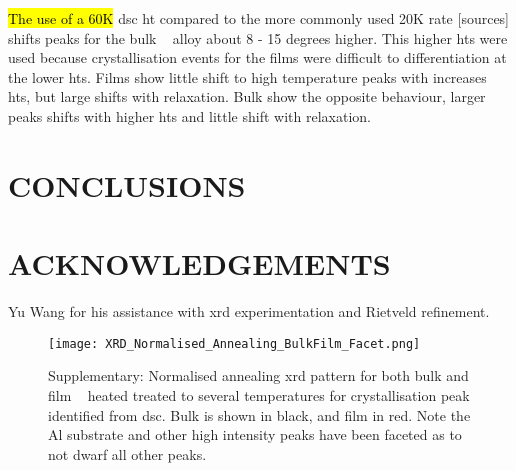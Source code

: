 \documentclass[a4paper,12pt,oneside]{article}%
\begin{document}
\hl{The use of a 60K} \gls{dsc} \acrfull{ht} compared to the more commonly used 20K rate [sources] shifts peaks for the bulk \MgZnCa~ alloy about 8 - 15 degrees higher. This higher \glspl{ht} were used because crystallisation events for the films were difficult to differentiation at the lower \glspl{ht}. 
Films show little shift to high temperature peaks with increases \glspl{ht}, but large shifts with relaxation. 
Bulk show the opposite behaviour, larger peaks shifts with higher \glspl{ht} and little shift with relaxation.


\section{CONCLUSIONS}


\section{ACKNOWLEDGEMENTS}

Yu Wang for his assistance with \acrshort{xrd} experimentation and Rietveld refinement. 







\begin{figure}[b]
	\centering
	\texttt{[image: XRD\_Normalised\_Annealing\_BulkFilm\_Facet.png]}
	\caption{Supplementary: Normalised annealing \acrshort{xrd} pattern for both bulk and film \MgZnCa~ heated treated to several temperatures for crystallisation peak identified from \acrshort{dsc}. Bulk is shown in black, and film in red. Note the Al substrate and other high intensity peaks have been faceted as to not dwarf all other peaks.}
	\label{fig:XRD_Annealing_BulkandFilm}
\end{figure}
\end{document}
